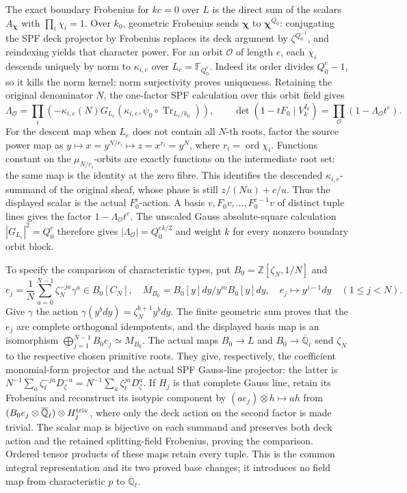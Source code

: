 The exact boundary Frobenius for \(kc=0\) over \(L\)
is the direct sum of the scalars \(A_{\boldsymbol\chi}\)
with \(\prod_i\chi_i=1\).  Over \(k_0\), geometric
Frobenius sends \(\boldsymbol\chi\) to
\(\boldsymbol\chi^{Q_0}\): conjugating the SPF deck
projector by Frobenius replaces its deck argument
by \(\zeta^{Q_0^{-1}}\), and reindexing yields that
character power.  For an orbit \(\mathcal O\) of
length \(e\), each \(\chi_i\) descends uniquely by
norm to \(\kappa_{i,e}\) over \(L_e=\mathbb F_{Q_0^e}\).
Indeed its order divides \(Q_0^e-1\), so it kills
the norm kernel; norm surjectivity proves uniqueness.
Retaining the original denominator \(N\), the
one-factor SPF calculation over this orbit field gives
\[
 \Lambda_{\mathcal O}
   =\prod_i\left(-\kappa_{i,e}(N)
       G_{L_e}(\kappa_{i,e},\psi_0\circ\operatorname{Tr}_{L_e/k_0})\right),
 \qquad
 \det(1-tF_0\mid V_k^{I_0})
       =\prod_{\mathcal O}(1-\Lambda_{\mathcal O}t^e).
\tag{BTF.5}\label{eq:btf5}
\]
For the descent map when \(L_e\) does not contain
all \(N\)-th roots, factor the source power map as
\(y\mapsto x=y^{N/r_i}\mapsto z=x^{r_i}=y^N\),
where \(r_i=\operatorname{ord}\chi_i\).  Functions
constant on the \(\mu_{N/r_i}\)-orbits are exactly
functions on the intermediate root set; the same
map is the identity at the zero fibre.  This
identifies the descended \(\kappa_{i,e}\)-summand
of the original sheaf, whose phase is still
\(z/(Nu)+c/u\).  Thus the displayed scalar is the
actual \(F_0^e\)-action.  A basis
\(v,F_0v,\ldots,F_0^{e-1}v\) of distinct tuple
lines gives the factor \(1-\Lambda_{\mathcal O}t^e\).
The unscaled Gauss absolute-square calculation
\(|G_{L_e}|^2=Q_0^e\) therefore gives
\(|\Lambda_{\mathcal O}|=Q_0^{ek/2}\) and weight
\(k\) for every nonzero boundary orbit block.

To specify the comparison of characteristic types,
put \(B_0=\mathbb Z[\zeta_N,1/N]\) and
\[
 e_j=\frac1N\sum_{a=0}^{N-1}\zeta_N^{-ja}\gamma^a
          \in B_0[C_N],\quad
 M_{B_0}=B_0[y]dy/y^mB_0[y]dy,
 \quad e_j\longmapsto y^{j-1}dy\quad(1\leq j<N).
\tag{BTF.6}\label{eq:btf6}
\]
Give \(\gamma\) the action
\(\gamma(y^bdy)=\zeta_N^{b+1}y^bdy\).  The finite
geometric sum proves that the \(e_j\) are complete
orthogonal idempotents, and the displayed basis
map is an isomorphism
\(\bigoplus_{j=1}^{N-1}B_0e_j\simeq M_{B_0}\).
The actual maps \(B_0\to L\) and
\(B_0\to\overline{\mathbb Q}_\ell\) send
\(\zeta_N\) to the respective chosen primitive
roots.  They give, respectively, the coefficient
monomial-form projector and the actual SPF Gauss-line
projector: the latter is
\(N^{-1}\sum_a\zeta_\ell^{-ja}D_\zeta^{-a}
 =N^{-1}\sum_a\zeta_\ell^{ja}D_\zeta^a\).
If \(H_j\) is that complete Gauss line, retain its
Frobenius and reconstruct its isotypic component by
\((ae_j)\otimes h\mapsto ah\) from
\((B_0e_j\otimes\overline{\mathbb Q}_\ell)
 \otimes H_j^{\rm triv}\), where only the deck
action on the second factor is made trivial.
The scalar map is bijective on each summand and
preserves both deck action and the retained
splitting-field Frobenius, proving the comparison.
Ordered tensor products of these maps retain every
tuple.  This is the common integral representation
and its two proved base changes; it introduces no
field map from characteristic \(p\) to
\(\overline{\mathbb Q}_\ell\).

